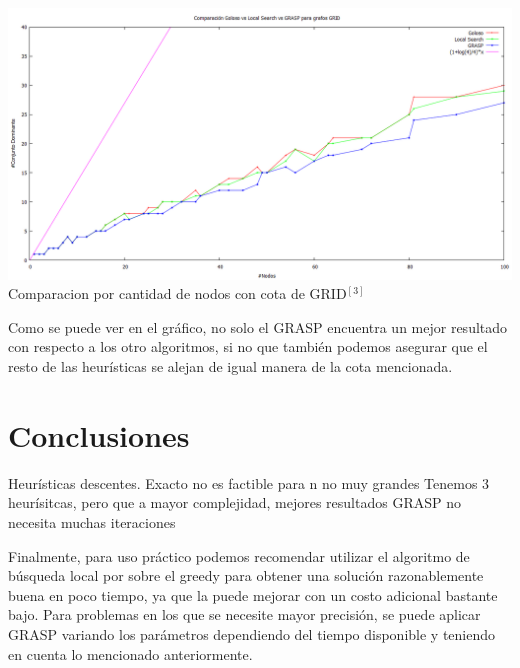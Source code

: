 \begin{center}
\includegraphics[width=17cm]{./graficos/comparacion_heuristicas_cd.png}\\
Comparacion por cantidad de nodos con cota de GRID$^[3]$
\end{center}

Como se puede ver en el gráfico, no solo el GRASP encuentra un mejor resultado con respecto a los otro algoritmos, si no que también
podemos asegurar que el resto de las heurísticas se alejan de igual manera de la cota mencionada.


\section{Conclusiones}
Heurísticas descentes. Exacto no es factible para n no muy grandes
Tenemos 3 heurísitcas, pero que a mayor complejidad, mejores resultados
GRASP no necesita muchas iteraciones


Finalmente, para uso práctico podemos recomendar utilizar el algoritmo de búsqueda local por sobre el greedy para obtener
una solución razonablemente buena en poco tiempo, ya que la puede mejorar con un costo adicional bastante bajo. Para problemas
en los que se necesite mayor precisión, se puede aplicar GRASP variando los parámetros dependiendo del tiempo disponible y
teniendo en cuenta lo mencionado anteriormente.








